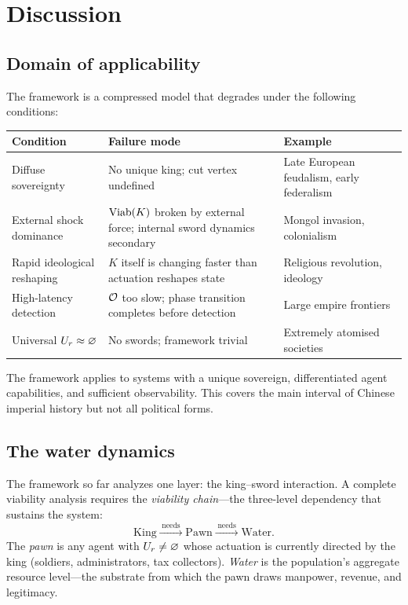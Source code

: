 \chapter{Discussion}\label{sec:discussion}

\section{Domain of applicability}\label{sec:domain}

The framework is a compressed model that degrades under the following
conditions:

\begin{center}
\begin{tabular}{@{}lp{5.5cm}p{5cm}@{}}
\toprule
\textbf{Condition} & \textbf{Failure mode} & \textbf{Example} \\
\midrule
Diffuse sovereignty & No unique king; cut vertex undefined & Late
European feudalism, early federalism \\
External shock dominance & $\mathrm{Viab}(K)$ broken by external force;
internal sword dynamics secondary & Mongol invasion, colonialism \\
Rapid ideological reshaping & $K$ itself is changing faster than
actuation reshapes state & Religious revolution, ideology \\
High-latency detection & $\mathcal{O}$ too slow; phase transition completes
before detection & Large empire frontiers \\
Universal $U_r \approx \varnothing$ & No swords; framework trivial &
Extremely atomised societies \\
\bottomrule
\end{tabular}
\end{center}

The framework applies to systems with a unique sovereign, differentiated
agent capabilities, and sufficient observability. This covers the main
interval of Chinese imperial history but not all political forms.

\section{The water dynamics}\label{sec:water}

The framework so far analyzes one layer: the king--sword interaction. A
complete viability analysis requires the \emph{viability chain}---the
three-level dependency that sustains the system:
\[
  \text{King}
  \xrightarrow{\;\text{needs}\;}
  \text{Pawn}
  \xrightarrow{\;\text{needs}\;}
  \text{Water.}
\]
The \emph{pawn} is any agent with $U_r \neq \varnothing$ whose actuation
is currently directed by the king (soldiers, administrators, tax
collectors). \emph{Water} is the population's aggregate resource
level---the substrate from which the pawn draws manpower, revenue, and
legitimacy.


